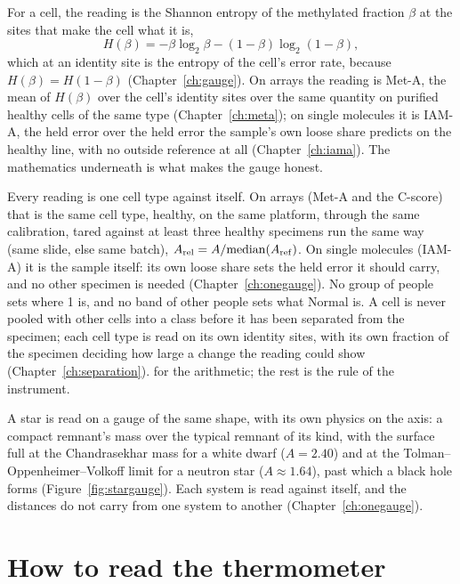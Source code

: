 For a cell, the reading is the Shannon entropy of the methylated fraction $\beta$ at the sites that make the cell what it is,
\begin{equation}
  H(\beta)=-\beta\log_2\beta-(1-\beta)\log_2(1-\beta),
\end{equation}
which at an identity site is the entropy of the cell's error rate, because $H(\beta)=H(1-\beta)$ (Chapter~\ref{ch:gauge}). \derived{} On
arrays the reading is Met-A, the mean of $H(\beta)$ over the cell's identity sites over the same quantity on purified healthy cells of
the same type (Chapter~\ref{ch:meta}); on single molecules it is IAM-A, the held error over the held error the sample's own loose share predicts on the healthy line, with no outside reference at all (Chapter~\ref{ch:iama}). The mathematics underneath is what makes the gauge honest.

\begin{keybox}[title=Measured against the cell's own healthy state]
Every reading is one cell type against itself. On arrays (Met-A and the C-score) that is the same cell type, healthy, on the same platform, through the same calibration, tared against at least three healthy specimens run the same way (same slide, else same batch), $A_{\rm rel}=A/\mathrm{median}(A_{\rm ref})$. On single molecules (IAM-A) it is the sample itself: its own loose share sets the held error it should carry, and no other specimen is needed (Chapter~\ref{ch:onegauge}). No group of people sets where 1 is, and no band of other people sets what Normal is. A cell is never
pooled with other cells into a class before it has been separated from the specimen; each cell type is read on its own identity sites,
with its own fraction of the specimen deciding how large a change the reading could show (Chapter~\ref{ch:separation}). \derived{} for
the arithmetic; the rest is the rule of the instrument.
\end{keybox}

A star is read on a gauge of the same shape, with its own physics on the axis: a compact remnant's mass over the typical remnant of its
kind, with the surface full at the Chandrasekhar mass for a white dwarf ($A=2.40$) and at the Tolman--Oppenheimer--Volkoff limit for a
neutron star ($A\approx1.64$), past which a black hole forms (Figure~\ref{fig:stargauge}). \calc{} Each system is read against itself, and
the distances do not carry from one system to another (Chapter~\ref{ch:onegauge}).

\section{How to read the thermometer}\label{sec:ag_read}

